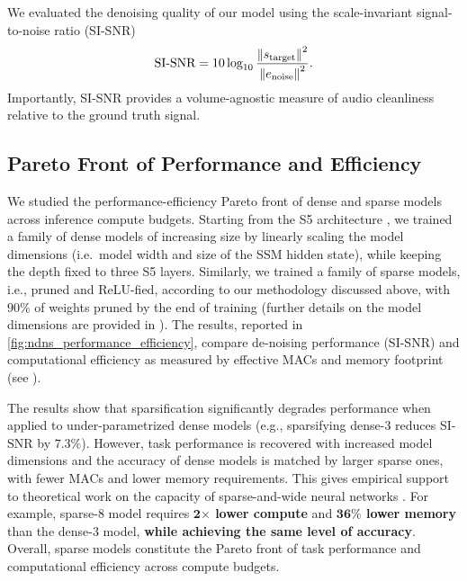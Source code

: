 We evaluated the denoising quality of our model using the scale-invariant signal-to-noise ratio (SI-SNR)
\begin{equation}
    \text{SI-SNR} = 10\log_{10}\frac{\left\lVert s_\text{target}\right\rVert^2}{\left\lVert e_\text{noise}\right\rVert^2}.
\end{equation}
Importantly, SI-SNR provides a volume-agnostic measure of audio cleanliness relative to the ground truth signal. 



\subsection{Pareto Front of Performance and Efficiency}
\label{ss:pareto-front}

We studied the performance-efficiency Pareto front of dense and sparse models across inference compute budgets.
Starting from the S5 architecture \cite{DBLP:conf/iclr/SmithWL23}, we trained a family of dense models of increasing size by linearly scaling the model dimensions (i.e.\ model width and size of the SSM hidden state), while keeping the depth fixed to three S5 layers.
Similarly, we trained a family of sparse models, i.e., pruned and ReLU-fied, according to our methodology discussed above, with $90\%$ of weights pruned by the end of training (further details on the model dimensions are provided in ).
The results, reported in \autoref{fig:ndns_performance_efficiency}, compare de-noising performance (SI-SNR) and computational efficiency as measured by effective MACs and memory footprint (see ).
%
%

The results show that sparsification significantly degrades performance when applied to under-parametrized dense models (e.g., sparsifying dense-\qty{3}{} reduces SI-SNR by $7.3\%$).
However, task performance is recovered with increased model dimensions and the accuracy of dense models is matched by larger sparse ones, with fewer MACs and lower memory requirements.
This gives empirical support to theoretical work on the capacity of sparse-and-wide neural networks \cite{golubeva_are_2020}.
For example, sparse-\qty{8}{} model requires \textbf{$\mathbf{2}\boldsymbol{\times}$ lower compute} and \textbf{$\mathbf{36}\boldsymbol{\%}$ lower memory} than the dense-\qty{3}{} model, \textbf{while achieving the same level of accuracy}.
Overall, sparse models constitute the Pareto front of task performance and computational efficiency across compute budgets.

